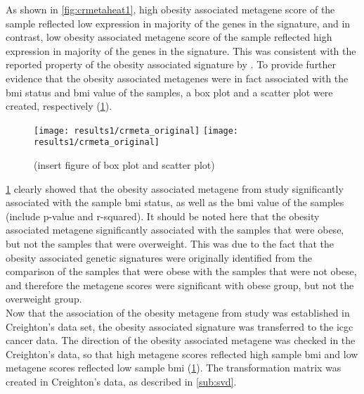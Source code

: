 As shown in \cref{fig:crmetaheat1}, high obesity associated metagene score of the sample reflected low expression in majority of the genes in the signature, and in contrast, low obesity associated metagene score of the sample reflected high expression in majority of the genes in the signature.
This was consistent with the reported property of the obesity associated signature by \citet{Creighton2012}.
To provide further evidence that the obesity associated metagenes were in fact associated with the \gls{bmi} status and \gls{bmi} value of the samples, a box plot and a scatter plot were created, respectively (\cref{fig:crmetaboxplot1}).

\begin{figure}[htp!]
	\centering
	\texttt{[image: results1/crmeta\_original]}
	\hfill
	\texttt{[image: results1/crmeta\_original]}
	\caption[Creighton metagene and sample \gls{bmi}/\gls{bmi} status]{(insert figure of box plot and scatter plot)}
	\label{fig:crmetaboxplot1}
\end{figure}

\cref{fig:crmetaboxplot1} clearly showed that the obesity associated metagene from \citet{Creighton2012} study significantly associated with the sample \gls{bmi} status, as well as the \gls{bmi} value of the samples (include p-value and r-squared).
It should be noted here that the obesity associated metagene significantly associated with the samples that were obese, but not the samples that were overweight.
This was due to the fact that the obesity associated genetic signatures were originally identified from the comparison of the samples that were obese with the samples that were not obese, and therefore the metagene scores were significant with obese group, but not the overweight group.
\\

\noindent
Now that the association of the obesity metagene from \citet{Creighton2012} study was established in Creighton's data set, the obesity associated signature was transferred to the \gls{icgc} cancer data.
The direction of the obesity associated metagene was checked in the Creighton's data, so that high metagene scores reflected high sample \gls{bmi} and low metagene scores reflected low sample \gls{bmi} (\cref{fig:crmetaboxplot1}).
The transformation matrix was created in Creighton's data, as described in \cref{sub:svd}.

